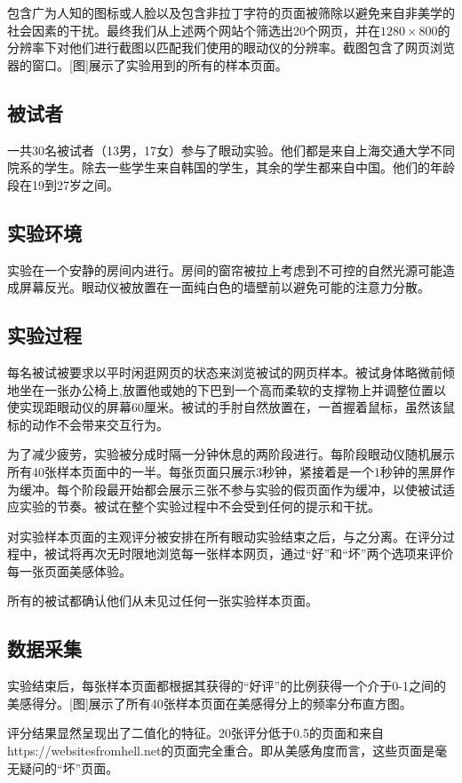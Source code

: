 包含广为人知的图标或人脸以及包含非拉丁字符的页面被筛除以避免来自非美学的社会因素的干扰。最终我们从上述两个网站个筛选出20个网页，并在$1280\times800$的分辨率下对他们进行截图以匹配我们使用的眼动仪的分辨率。截图包含了网页浏览器的窗口。[图]展示了实验用到的所有的样本页面。

\subsection{被试者}
一共30名被试者（13男，17女）参与了眼动实验。他们都是来自上海交通大学不同院系的学生。除去一些学生来自韩国的学生，其余的学生都来自中国。他们的年龄段在19到27岁之间。

\subsection{实验环境}
实验在一个安静的房间内进行。房间的窗帘被拉上考虑到不可控的自然光源可能造成屏幕反光。眼动仪被放置在一面纯白色的墙壁前以避免可能的注意力分散。

\subsection{实验过程}
每名被试被要求以平时闲逛网页的状态来浏览被试的网页样本。被试身体略微前倾地坐在一张办公椅上,放置他或她的下巴到一个高而柔软的支撑物上并调整位置以使实现距眼动仪的屏幕60厘米。被试的手肘自然放置在，一首握着鼠标，虽然该鼠标的动作不会带来交互行为。

为了减少疲劳，实验被分成时隔一分钟休息的两阶段进行。每阶段眼动仪随机展示所有40张样本页面中的一半。每张页面只展示3秒钟，紧接着是一个1秒钟的黑屏作为缓冲。每个阶段最开始都会展示三张不参与实验的假页面作为缓冲，以使被试适应实验的节奏。被试在整个实验过程中不会受到任何的提示和干扰。

对实验样本页面的主观评分被安排在所有眼动实验结束之后，与之分离。在评分过程中，被试将再次无时限地浏览每一张样本网页，通过“好”和“坏”两个选项来评价每一张页面美感体验。

所有的被试都确认他们从未见过任何一张实验样本页面。

\subsection{数据采集}
实验结束后，每张样本页面都根据其获得的“好评”的比例获得一个介于0-1之间的美感得分。[图]展示了所有40张样本页面在美感得分上的频率分布直方图。

评分结果显然呈现出了二值化的特征。20张评分低于0.5的页面和来自{https://websitesfromhell.net}的页面完全重合。即从美感角度而言，这些页面是毫无疑问的“坏”页面。

